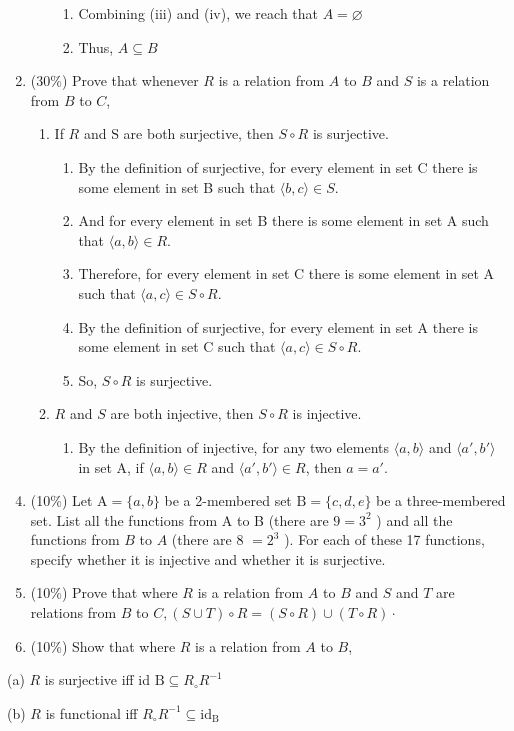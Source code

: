 \documentclass[10pt]{article}
\begin{document}
\begin{enumerate}
\begin{enumerate}
\begin{enumerate}
        \item Combining (iii) and (iv), we reach that $A = \varnothing$
        \item Thus, $A \subseteq B$
      \end{enumerate}
    \end{enumerate}
  \item (30\%) Prove that whenever $R$ is a relation from $A$ to $B$ and $S$ is a relation from $B$ to $C$,
  \begin{enumerate}
    \item If $R$ and $\mathrm{S}$ are both surjective, then $S \circ R$ is surjective.
      \begin{enumerate}
        \item By the definition of surjective, for every element in set C there is some element in set B such that $\langle b, c\rangle \in S$.
        \item And for every element in set B there is some element in set A such that $\langle a, b\rangle \in R$.
        \item Therefore, for every element in set C there is some element in set A such that $\langle a, c\rangle \in S \circ R$.
        \item By the definition of surjective, for every element in set A there is some element in set C such that $\langle a, c\rangle \in S \circ R$.
        \item So, $S \circ R$ is surjective.
      \end{enumerate}
    \item $R$ and $S$ are both injective, then $S \circ R$ is injective.
      \begin{enumerate}
        \item By the definition of injective, for any two elements $\langle a, b\rangle$ and $\langle a', b'\rangle$ in set A, if $\langle a, b\rangle \in R$ and $\langle a', b'\rangle \in R$, then $a=a'$.
      \end{enumerate}
  \end{enumerate}
  \end{enumerate}
\begin{enumerate}
  \setcounter{enumi}{3}
  \item (10\%) Let $\mathrm{A}=\{a, b\}$ be a 2-membered set $\mathrm{B}=\{c, d, e\}$ be a three-membered set. List all the functions from A to B (there are $9=3^{2}$ ) and all the functions from $B$ to $A$ (there are 8 $=2^{3}$ ). For each of these 17 functions, specify whether it is injective and whether it is surjective.

  \item (10\%) Prove that where $R$ is a relation from $A$ to $B$ and $S$ and $T$ are relations from $B$ to $C,(S \cup T) \circ R=(S \circ R) \cup(T \circ R) \cdot$

  \item (10\%) Show that where $R$ is a relation from $A$ to $B$,

\end{enumerate}
(a) $R$ is surjective iff id $\mathrm{B} \subseteq R_{\circ} R^{-1}$

(b) $R$ is functional iff $R_{\circ} R^{-1} \subseteq \mathrm{id}_{\mathrm{B}}$
\end{document}
